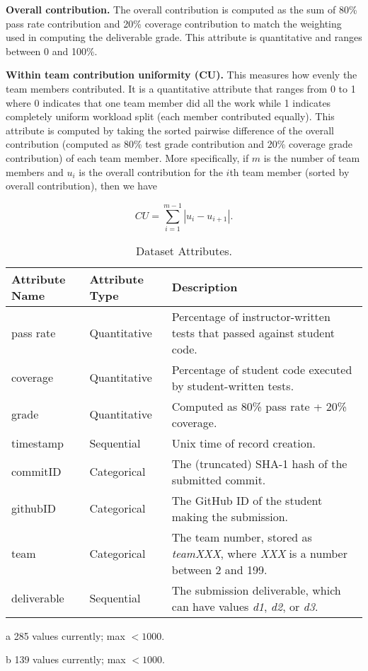 \documentclass[../manifest.tex]{subfiles}
\begin{document}
\textbf{Overall contribution.} The overall contribution is computed as the sum of 80\% pass rate contribution and 20\% coverage contribution to match the weighting used in computing the deliverable grade. This attribute is quantitative and ranges between 0 and 100\%.

\textbf{Within team contribution uniformity (CU).} This measures how evenly the team members contributed. It is a quantitative attribute that ranges from 0 to 1 where 0 indicates that one team member did all the work while 1 indicates completely uniform workload split (each member contributed equally). This attribute is computed by taking the sorted pairwise difference of the overall contribution (computed as 80\% test grade contribution and 20\% coverage grade contribution) of each team member. More specifically, if $m$ is the number of team members and $u_i$ is the overall contribution for the $i$th team member (sorted by overall contribution), then we have

\begin{equation}
  \label{eq:con-uniform}
  CU = \sum_{i=1}^{m-1} |u_i - u_{i+1}|.
\end{equation}


\begin{table*}[t]
  \label{tab:attributes}
  \centering
  \begin{threeparttable}
      \caption{Dataset Attributes.}
  \begin{tabular*}{\textwidth}{lll}
    \hline
    \textbf{Attribute Name} & \textbf{Attribute Type} & \textbf{Description} \\
    \hline
    pass rate     & Quantitative & Percentage of instructor-written tests that passed against student code. \\
    coverage  & Quantitative & Percentage of student code executed by student-written tests. \\
    grade     & Quantitative & Computed as 80\% pass rate + 20\% coverage. \\
    timestamp      & Sequential   & Unix time of record creation. \\
    commitID      & Categorical  & The (truncated) SHA-1 hash of the submitted commit. \\
    githubID      & Categorical\tnote{a}  & The GitHub ID of the student making the submission. \\
    team           & Categorical\tnote{b}  & The team number, stored as \textit{teamXXX}, where \textit{XXX} is a number between 2 and 199. \\
    deliverable    & Sequential   & The submission deliverable, which can have values \textit{d1}, \textit{d2}, or \textit{d3}. \\
    \hline
  \end{tabular*}
  \begin{tablenotes}\footnotesize
    \item [a] 285 values currently; max $<1000$.
    \item [b] 139 values currently; max $<1000$.
\end{tablenotes}
\end{threeparttable}
\end{table*}
\end{document}
